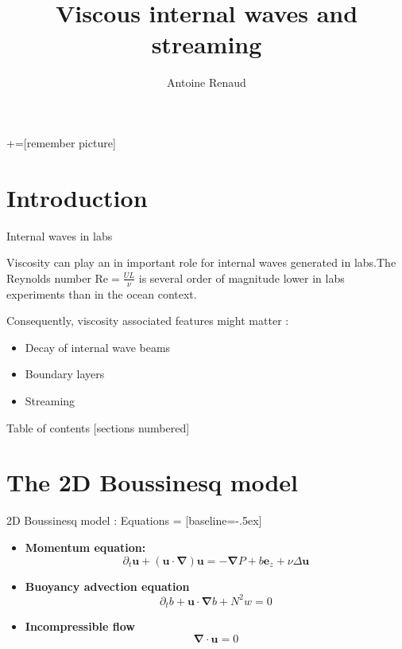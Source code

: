 \documentclass[10pt]{beamer}
\title{Viscous internal waves and streaming}
\subtitle{}
\date{}
\author{Antoine Renaud}
\institute{Laboratoire de Physique, ENS Lyon}
\begin{document}
+=[remember picture]
\everymath{\displaystyle}

\maketitle

\section{Introduction}

\begin{frame}[fragile]{Internal waves in labs}

  Viscosity can play an in important role for internal waves generated in labs.The Reynolds number $\mathrm{Re}=\frac{UL}{\nu}$  is several order of magnitude lower  in labs experiments than in the ocean context. 

  Consequently, viscosity associated features might matter :
  \begin{itemize}
    \item Decay of internal wave beams
    \item Boundary layers
    \item Streaming
  \end{itemize}
\end{frame}

\begin{frame}{Table of contents}
  [sections numbered]
  \tableofcontents[hideallsubsections]
\end{frame}

\section{The 2D Boussinesq model}

\begin{frame}[fragile]{2D Boussinesq model : Equations}
   = [baseline=-.5ex]
  \begin{itemize}
    \item \textbf{Momentum equation:}
      \begin{equation*}
        \partial_{t}\mathbf{u}+\left(\mathbf{u}\cdot\boldsymbol{\nabla}\right)\mathbf{u} = -\boldsymbol{\nabla}P+b\mathbf{e}_{z}+\nu\Delta\mathbf{u}  
      \end{equation*}
    \item \textbf{Buoyancy advection equation}
      \begin{equation*}
        \partial_{t}b+\mathbf{u}\cdot\boldsymbol{\nabla}b+N^{2}w =0 
      \end{equation*}
    \item \textbf{Incompressible flow} 
      \begin{equation*}
        \boldsymbol{\nabla}\cdot\mathbf{u} =0
      \end{equation*}
  \end{itemize}
\end{frame}
\end{document}

